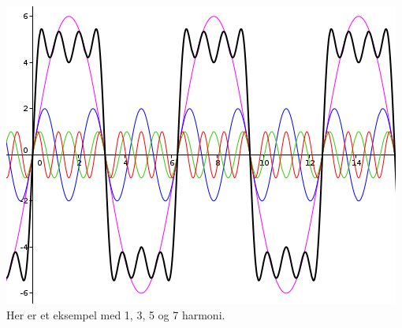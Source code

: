 \\\\
\includegraphics[width=\textwidth]{./img/harmoni-1357}
Her er et eksempel med 1, 3, 5 og 7 harmoni.
